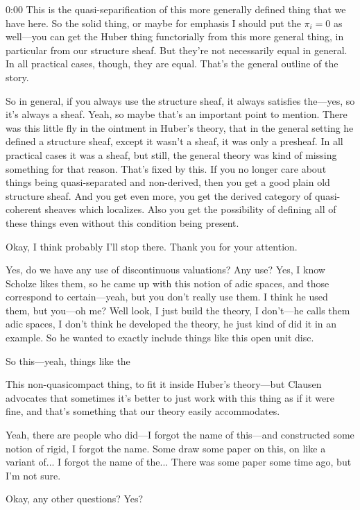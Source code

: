 \begin{unfinished}{0:00}
This is the quasi-separification of this more generally defined thing that we have here. So the solid thing, or maybe for emphasis I should put the $\pi_i = 0$ as well---you can get the Huber thing functorially from this more general thing, in particular from our structure sheaf. But they're not necessarily equal in general. In all practical cases, though, they are equal. That's the general outline of the story.

So in general, if you always use the structure sheaf, it always satisfies the---yes, so it's always a sheaf. Yeah, so maybe that's an important point to mention. There was this little fly in the ointment in Huber's theory, that in the general setting he defined a structure sheaf, except it wasn't a sheaf, it was only a presheaf. In all practical cases it was a sheaf, but still, the general theory was kind of missing something for that reason. That's fixed by this. If you no longer care about things being quasi-separated and non-derived, then you get a good plain old structure sheaf. And you get even more, you get the derived category of quasi-coherent sheaves which localizes. Also you get the possibility of defining all of these things even without this condition being present.

Okay, I think probably I'll stop there. Thank you for your attention.

Yes, do we have any use of discontinuous valuations? Any use? Yes, I know Scholze likes them, so he came up with this notion of adic spaces, and those correspond to certain---yeah, but you don't really use them. I think he used them, but you---oh me? Well look, I just build the theory, I don't---he calls them adic spaces, I don't think he developed the theory, he just kind of did it in an example. So he wanted to exactly include things like this open unit disc.

So this---yeah, things like the 

This non-quasicompact thing, to fit it inside Huber's theory---but Clausen advocates that sometimes it's better to just work with this thing as if it were fine, and that's something that our theory easily accommodates.

Yeah, there are people who did---I forgot the name of this---and constructed some notion of rigid, I forgot the name. Some draw some paper on this, on like a variant of... I forgot the name of the... There was some paper some time ago, but I'm not sure.

Okay, any other questions? Yes?


\end{unfinished}
